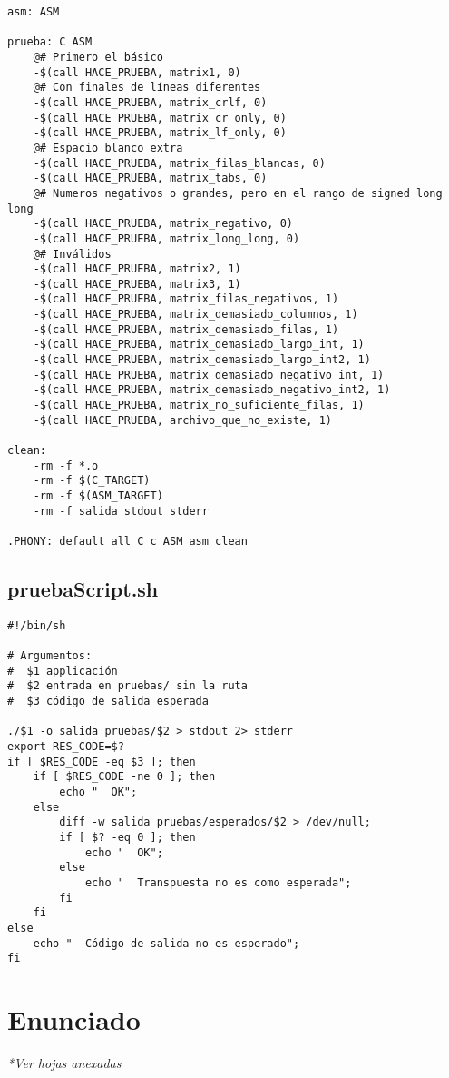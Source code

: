 \documentclass[a4paper]{article}
\begin{document}
\begin{verbatim}
asm: ASM

prueba: C ASM
	@# Primero el básico
	-$(call HACE_PRUEBA, matrix1, 0)
	@# Con finales de líneas diferentes
	-$(call HACE_PRUEBA, matrix_crlf, 0)
	-$(call HACE_PRUEBA, matrix_cr_only, 0)
	-$(call HACE_PRUEBA, matrix_lf_only, 0)
	@# Espacio blanco extra
	-$(call HACE_PRUEBA, matrix_filas_blancas, 0)
	-$(call HACE_PRUEBA, matrix_tabs, 0)
	@# Numeros negativos o grandes, pero en el rango de signed long long
	-$(call HACE_PRUEBA, matrix_negativo, 0)
	-$(call HACE_PRUEBA, matrix_long_long, 0)
	@# Inválidos
	-$(call HACE_PRUEBA, matrix2, 1)
	-$(call HACE_PRUEBA, matrix3, 1)
	-$(call HACE_PRUEBA, matrix_filas_negativos, 1)
	-$(call HACE_PRUEBA, matrix_demasiado_columnos, 1)
	-$(call HACE_PRUEBA, matrix_demasiado_filas, 1)
	-$(call HACE_PRUEBA, matrix_demasiado_largo_int, 1)
	-$(call HACE_PRUEBA, matrix_demasiado_largo_int2, 1)
	-$(call HACE_PRUEBA, matrix_demasiado_negativo_int, 1)
	-$(call HACE_PRUEBA, matrix_demasiado_negativo_int2, 1)
	-$(call HACE_PRUEBA, matrix_no_suficiente_filas, 1)
	-$(call HACE_PRUEBA, archivo_que_no_existe, 1)

clean:
	-rm -f *.o
	-rm -f $(C_TARGET)
	-rm -f $(ASM_TARGET)
	-rm -f salida stdout stderr

.PHONY: default all C c ASM asm clean
\end{verbatim}

\subsection{pruebaScript.sh}
\begin{verbatim}
#!/bin/sh

# Argumentos:
#  $1 applicación
#  $2 entrada en pruebas/ sin la ruta
#  $3 código de salida esperada

./$1 -o salida pruebas/$2 > stdout 2> stderr
export RES_CODE=$?
if [ $RES_CODE -eq $3 ]; then
    if [ $RES_CODE -ne 0 ]; then
        echo "  OK";
    else
        diff -w salida pruebas/esperados/$2 > /dev/null;
        if [ $? -eq 0 ]; then
            echo "  OK";
        else
            echo "  Transpuesta no es como esperada";
        fi
    fi
else
    echo "  Código de salida no es esperado";
fi
\end{verbatim}

\section{Enunciado}
\textit{*Ver hojas anexadas}
\end{document}
